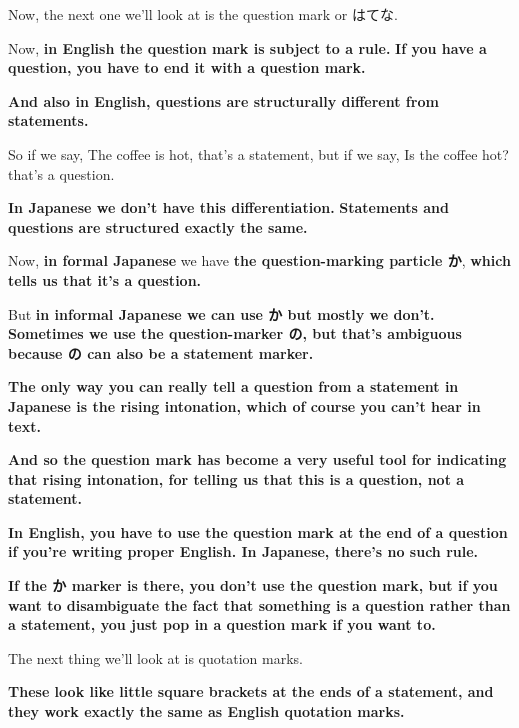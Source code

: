 Now, the next one we'll look at is the question mark or はてな.

{}

Now, {\bf in English the question mark is subject to a rule.} {\bf If you have a question, you have to end it with a question mark.}

{\bf And also in English, questions are structurally different from statements.}

So if we say, The coffee is hot, that's a statement, but if we say, Is the coffee hot? that's a question.

\thinrule

{\bf In Japanese we don't have this differentiation.} {\bf Statements and questions are structured exactly the same.}

Now, {\bf in formal Japanese} we have {\bf the question-marking particle か}, {\bf which tells us that it's a question.}

But {\bf in informal Japanese we can use か but mostly we don't.} {\bf Sometimes we use the question-marker の, but that's ambiguous because の can also be a statement marker.}

\thinrule

{\bf The only way you can really tell a question from a statement in Japanese is the rising intonation, which of course you can't hear in text.}

{\bf And so the question mark has become a very useful tool for indicating that rising intonation, for telling us that this is a question, not a statement.}

{}

{\bf In English, you have to use the question mark at the end of a question if you're writing proper English. In Japanese, there's no such rule.}

{\bf If the か marker is there, you don't use the question mark, but if you want to disambiguate the fact that something is a question rather than a statement, you just pop in a question mark if you want to.}

\stopsectionlevel

\startsectionlevel[title={The quotation marks / 「　」},reference={the-quotation-marks}]

The next thing we'll look at is quotation marks.

{\bf These look like little square brackets at the ends of a statement, and they work exactly the same as English quotation marks.}

